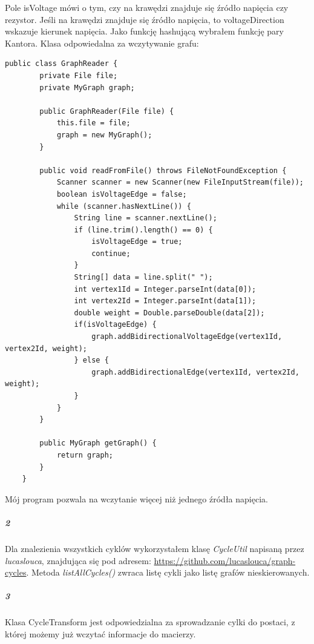 \documentclass[12pt,a4paper]{article}
\begin{document}
Pole isVoltage mówi o tym, czy na krawędzi znajduje się źródło napięcia czy
rezystor. Jeśli na krawędzi znajduje się źródło napięcia, to voltageDirection
wskazuje kierunek napięcia. \newline
Jako funkcję hashującą wybrałem funkcję pary Kantora. \newline
Klasa odpowiedalna za wczytywanie grafu:
\begin{Verbatim}[fontsize=\small]
    public class GraphReader {
        private File file;
        private MyGraph graph;

        public GraphReader(File file) {
            this.file = file;
            graph = new MyGraph();
        }

        public void readFromFile() throws FileNotFoundException {
            Scanner scanner = new Scanner(new FileInputStream(file));
            boolean isVoltageEdge = false;
            while (scanner.hasNextLine()) {
                String line = scanner.nextLine();
                if (line.trim().length() == 0) {
                    isVoltageEdge = true;
                    continue;
                }
                String[] data = line.split(" ");
                int vertex1Id = Integer.parseInt(data[0]);
                int vertex2Id = Integer.parseInt(data[1]);
                double weight = Double.parseDouble(data[2]);
                if(isVoltageEdge) {
                    graph.addBidirectionalVoltageEdge(vertex1Id, vertex2Id, weight);
                } else {
                    graph.addBidirectionalEdge(vertex1Id, vertex2Id, weight);
                }
            }
        }

        public MyGraph getGraph() {
            return graph;
        }
    }
\end{Verbatim}
Mój program pozwala na wczytanie więcej niż jednego źródła napięcia.
\subparagraph{2} Dla znalezienia wszystkich cyklów wykorzystałem klasę \emph{CycleUtil}
napisaną przez \mbox{\emph{lucaslouca}}, znajdująca się pod adresem:
\url{https://github.com/lucaslouca/graph-cycles}. Metoda \mbox{\emph{listAllCycles()}} zwraca
listę cykli jako listę grafów nieskierowanych.
\subparagraph{3} Klasa CycleTransform jest odpowiedzialna za sprowadzanie cylki
do postaci, z której możemy już wczytać informacje do macierzy.
\end{document}
